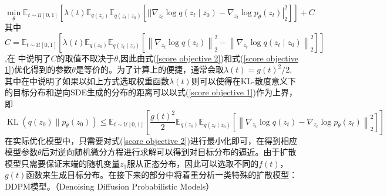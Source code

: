 \begin{equation}
    \min _{{\theta}} \mathbb{E}_{t \sim \mathcal{U}[0,1]}\left[\lambda(t) \mathbb{E}_{q\left({z}_0\right)} \mathbb{E}_{q\left({z}_t \mid {z}_0\right)}\left[|| \nabla_{{z}_t} \log q\left({z}_t \mid {z}_0\right)-\left.\nabla_{{z}_t} \log p_{{\theta}}\left({z}_t\right)\right|_2 ^2\right]\right]+C
    \label{score objective 2}
\end{equation}
其中$C=\mathbb{E}_{t \sim \mathcal{U}[0,1]}\left[\lambda(t) \mathbb{E}_{q\left({z}_0\right)} \mathbb{E}_{q\left({z}_t \mid {z}_0\right)}\left[\left\|\nabla_{{z}_t} \log q\left({z}_t\right)\right\|_2^2-\left\|\nabla_{{z}_t} \log q\left({z}_t \mid {z}_0\right)\right\|_2^2\right]\right]$,在
\cite{vincent}中说明了$C$的取值不取决于$\theta$,因此由式(\ref{score objective 2})和式(\ref{score objective 1})优化得到的参数$\theta$是等价的。为了计算上的便捷，通常会取$\lambda(t) = g(t)^2/2$, 其中在\cite{song_2}中说明了如果以如上方式选取权重函数$\lambda(t)$则可以使得在KL-散度意义下的目标分布和逆向SDE生成的分布的距离可以以式(\ref{score objective 1})作为上界，即
\begin{equation}
\operatorname{KL}\left(q\left({z}_0\right) \| p_{{\theta}}\left({z}_0\right)\right) \leq \mathbb{E}_{t \sim \mathcal{U}[0,1]}\left[\frac{g(t)^2}{2} \mathbb{E}_{q\left({z}_0\right)} \mathbb{E}_{q\left({z}_t \mid {z}_0\right)}\left[\left\|\nabla_{{z}_t} \log q\left({z}_t\right)-\nabla_{{z}_t} \log p_{{\theta}}\left({z}_t\right)\right\|_2^2\right]\right]
    \label{KL upper bound 1}
\end{equation}
在实际优化模型中，只需要对式(\ref{score objective 2})进行最小化即可，在得到相应模型参数$\theta$后对逆向随机微分方程进行求解可以得到对目标分布的逼近。由于扩散模型只需要保证末端的随机变量$z_1$服从正态分布，因此可以选取不同的$f(t)$，$g(t)$函数来生成目标分布。在接下来的部分中将着重分析一类特殊的扩散模型：DDPM模型。（Denoising Diffusion Probabilistic Models）
